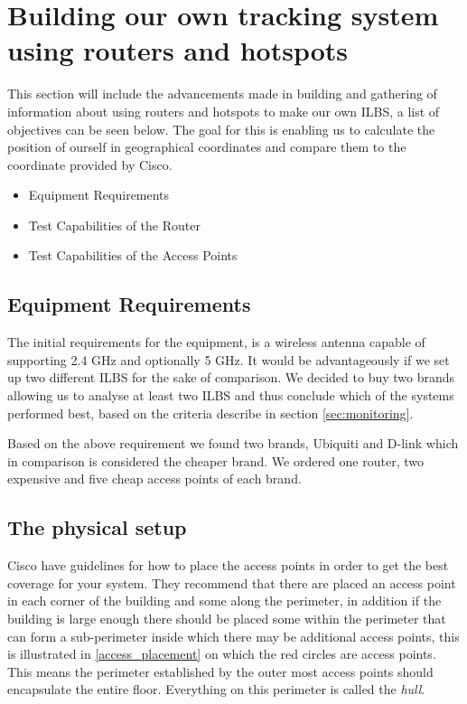 \section{Building our own tracking system using routers and hotspots}
This section will include the advancements made in building and gathering of information about using routers and hotspots to make our own ILBS, a list of objectives can be seen below. The goal for this is enabling us to calculate the position of ourself in geographical coordinates and compare them to the coordinate provided by Cisco.

\begin{itemize}
	\item Equipment Requirements
	\item Test Capabilities of the Router 
	\item Test Capabilities of the Access Points
\end{itemize}


\subsection*{Equipment Requirements}
The initial requirements for the equipment, is a wireless antenna capable of supporting 2.4 GHz and optionally 5 GHz. It would be advantageously if we set up two different ILBS for the sake of comparison. We decided to buy two brands allowing us to analyse at least two ILBS and thus conclude which of the systems performed best, based on the criteria describe in section \ref{sec:monitoring}.

Based on the above requirement we found two brands, Ubiquiti and D-link which in comparison is considered the cheaper brand. We ordered one router, two expensive and five cheap access points of each brand.

\subsection*{The physical setup}
Cisco\cite{access_point_placement} have guidelines for how to place the access points in order to get the best coverage for your system. They recommend that there are placed an access point in each corner of the building and some along the perimeter, in addition if the building is large enough there should be placed some within the perimeter that can form a sub-perimeter inside which there may be additional access points, this is illustrated in \cref{access_placement} on which the red circles are access points. This means the perimeter established by the outer most access points should encapsulate the entire floor. Everything on this perimeter is called the \textit{hull}\cite{access_point_placement}.

